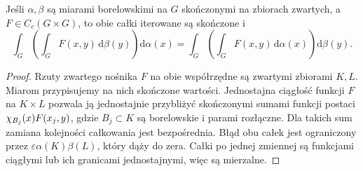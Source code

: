 \begin{lemat}
Jeśli $\alpha,\beta$ są miarami borelowskimi na $G$ skończonymi na zbiorach zwartych, a $F\in C_c(G\times G)$, to obie całki iterowane są skończone i
\[
\int_G\left(\int_GF(x,y)\,\mathrm d\beta(y)\right)\mathrm d\alpha(x)
=\int_G\left(\int_GF(x,y)\,\mathrm d\alpha(x)\right)\mathrm d\beta(y).
\]
\end{lemat}
\begin{proof}
Rzuty zwartego nośnika $F$ na obie współrzędne są zwartymi zbiorami $K,L$. Miarom przypisujemy na nich skończone wartości. Jednostajna ciągłość funkcji $F$ na $K\times L$ pozwala ją jednostajnie przybliżyć skończonymi sumami funkcji postaci $\chi_{B_j}(x)F(x_j,y)$, gdzie $B_j\subset K$ są borelowskie i parami rozłączne. Dla takich sum zamiana kolejności całkowania jest bezpośrednia. Błąd obu całek jest ograniczony przez $\varepsilon\alpha(K)\beta(L)$, który dąży do zera. Całki po jednej zmiennej są funkcjami ciągłymi lub ich granicami jednostajnymi, więc są mierzalne.
\end{proof}
